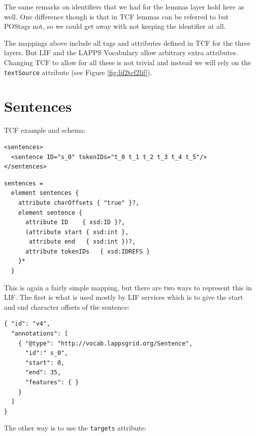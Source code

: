 \documentclass[11pt]{article}
\newcommand{\tag}[1]{{\tt #1}}
\newcommand{\attr}[1]{{\tt #1}}
\newenvironment{example}
    {\begin{tcolorbox}\small}
    {\end{tcolorbox}}
\begin{document}
The same remarks on identifiers that we had for the lemmas layer hold here as well. One difference though is that in TCF lemmas can be referred to but POStags not, so we could get away with not keeping the identifier at all.
 
The mappings above include all tags and attributes defined in TCF for the three layers. But LIF and the LAPPS Vocabulary allow arbitrary extra attributes. Changing TCF to allow for all these is not trivial and instead we will rely on the \tag{textSource} attribute (see Figure \ref{fig:lif2tcf2lif}).


\newpage
\section{Sentences}

TCF example and schema:

\begin{example}
\begin{verbatim}
<sentences>
  <sentence ID="s_0" tokenIDs="t_0 t_1 t_2 t_3 t_4 t_5"/>
</sentences>
\end{verbatim}
\end{example}

\begin{example}
\begin{verbatim}
sentences =
  element sentences {
    attribute charOffsets { "true" }?,
    element sentence {
      attribute ID    { xsd:ID }?,
      (attribute start { xsd:int },
       attribute end   { xsd:int })?,
      attribute tokenIDs   { xsd:IDREFS }
    }*
  }
\end{verbatim}
\end{example}

This is again a fairly simple mapping, but there are two ways to represent this in LIF. The first is what is used mostly by LIF services which is to give the start and end character offsets of the sentence:

\begin{example}
\begin{verbatim}
{ "id": "v4",
  "annotations": [
    { "@type": "http://vocab.lappsgrid.org/Sentence",
      "id":" s_0",
      "start": 0,
      "end": 35,
      "features": { } 
    }
  ]
}
\end{verbatim}
\end{example}

The other way is to use the \attr{targets} attribute:
\end{document}
